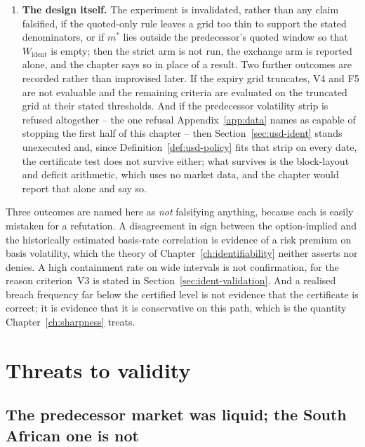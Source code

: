 \documentclass[../../../main.tex]{subfiles}
\begin{document}
\begin{enumerate}[label=\textbf{F\arabic*.},leftmargin=2.2\parindent]
\item \textbf{The design itself.} The experiment is invalidated, rather than any claim falsified, if the quoted-only rule leaves a grid too thin to support the stated denominators, or if $m^*$ lies outside the predecessor's quoted window so that $W_{\mathrm{ident}}$ is empty; then the strict arm is not run, the exchange arm is reported alone, and the chapter says so in place of a result. Two further outcomes are recorded rather than improvised later. If the expiry grid truncates, V4 and F5 are not evaluable and the remaining criteria are evaluated on the truncated grid at their stated thresholds. And if the predecessor volatility strip is refused altogether -- the one refusal Appendix~\ref{app:data} names as capable of stopping the first half of this chapter -- then Section~\ref{sec:usd-ident} stands unexecuted and, since Definition~\ref{def:usd-policy} fits that strip on every date, the certificate test does not survive either; what survives is the block-layout and deficit arithmetic, which uses no market data, and the chapter would report that alone and say so.
\end{enumerate}

Three outcomes are named here as \emph{not} falsifying anything, because each is easily mistaken for a refutation. A disagreement in sign between the option-implied and the historically estimated basis-rate correlation is evidence of a risk premium on basis volatility, which the theory of Chapter~\ref{ch:identifiability} neither asserts nor denies. A high containment rate on wide intervals is not confirmation, for the reason criterion~V3 is stated in Section~\ref{sec:ident-validation}. And a realised breach frequency far below the certified level is not evidence that the certificate is correct; it is evidence that it is conservative on this path, which is the quantity Chapter~\ref{ch:sharpness} treats.

\section{Threats to validity}\label{sec:usd-threats}

\subsection{The predecessor market was liquid; the South African one is not}
\end{document}
